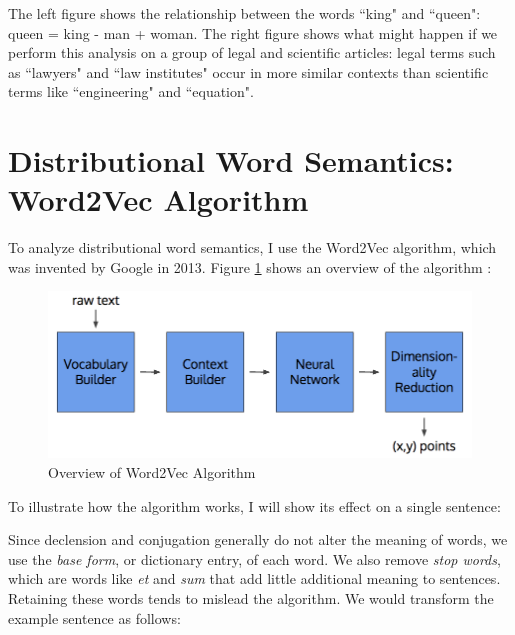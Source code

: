 \documentclass[a4paper, 12pt,notitlepage]{article} %
\newenvironment{tightcenter}{%
	\setlength\topsep{2pt}
	\setlength\parskip{2pt}
	\singlespacing %
	\begin{center}
	}{%
	\end{center}
}
\newenvironment{figurecenter}{%
	\setlength\topsep{-7pt}
	\setlength\parskip{-7pt}
	\singlespacing %
	\begin{center}
	}{%
	\end{center}
\vspace{-5pt}
}
\numberwithin{dummy}{subsection}
\numberwithin{dummy}{section}
\theoremstyle{named}
\theoremstyle{definition}
\theoremstyle{definition}
\begin{document}
\noindent The left figure shows the relationship between the words ``king" and ``queen": {\ttfamily queen = king - man + woman}. The right figure shows what might happen if we perform this analysis on a group of legal and scientific articles: legal terms such as ``lawyers" and ``law institutes" occur in more similar contexts than scientific terms like ``engineering" and ``equation".

\section{Distributional Word Semantics: Word2Vec Algorithm}

To analyze distributional word semantics, I use the Word2Vec algorithm, which was invented by Google in 2013. Figure \ref{a} shows an overview of the algorithm \cite{pythonnlp, gensim}:

\begin{figure}[H]
	\begin{figurecenter}
	\includegraphics[scale=0.4]{image5.png}
	\caption{Overview of Word2Vec Algorithm}
	\label{a}
	\end{figurecenter}
\end{figure}

\noindent To illustrate how the algorithm works, I will show its effect on a single sentence:

\begin{tightcenter}
	{\small {}}
\end{tightcenter}

\noindent Since declension and conjugation generally do not alter the meaning of words, we use the \textit{base form}, or dictionary entry, of each word. We also remove \textit{stop words}, which are words like \textit{et} and \textit{sum} that add little additional meaning to sentences. Retaining these words tends to mislead the algorithm. We would transform the example sentence as follows:
\end{document}
